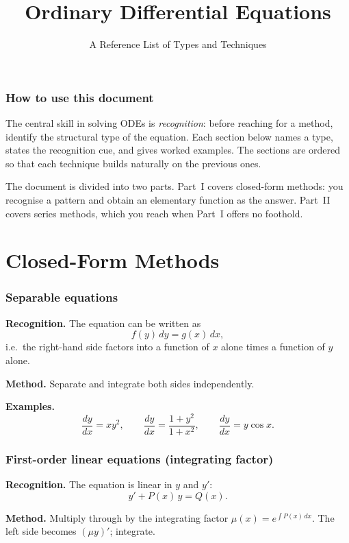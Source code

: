 \documentclass{essay}
\title{Ordinary Differential Equations}
\subtitle{A Reference List of Types and Techniques}
\author{}
\date{}
\begin{document}
\maketitle

\section*{How to use this document}

The central skill in solving ODEs is \emph{recognition}: before reaching for a method, identify the structural type of the equation.  Each section below names a type, states the recognition cue, and gives worked examples.  The sections are ordered so that each technique builds naturally on the previous ones.

The document is divided into two parts.  Part~I covers closed-form methods: you recognise a pattern and obtain an elementary function as the answer.  Part~II covers series methods, which you reach when Part~I offers no foothold.

\part{Closed-Form Methods}

\section{Separable equations}

\textbf{Recognition.}  The equation can be written as
\[ f(y)\,dy = g(x)\,dx, \]
i.e.\ the right-hand side factors into a function of \(x\) alone times a function of \(y\) alone.

\textbf{Method.}  Separate and integrate both sides independently.

\textbf{Examples.}
\[ \frac{dy}{dx} = xy^{2}, \qquad \frac{dy}{dx} = \frac{1+y^{2}}{1+x^{2}}, \qquad \frac{dy}{dx} = y\cos x. \]

\section{First-order linear equations (integrating factor)}

\textbf{Recognition.}  The equation is linear in \(y\) and \(y'\):
\[ y' + P(x)\,y = Q(x). \]

\textbf{Method.}  Multiply through by the integrating factor \(\mu(x) = e^{\int P(x)\,dx}\).  The left side becomes \((\mu y)'\); integrate.
\end{document}
